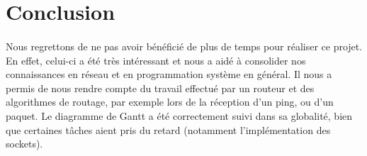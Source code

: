 \section{Conclusion}
\paragraph{}Nous regrettons de ne pas avoir bénéficié de plus de temps pour réaliser ce projet. En effet, celui-ci a été très intéressant et nous a aidé à consolider nos connaissances en réseau et en programmation système en général. Il nous a permis de nous rendre compte du travail effectué par un routeur et des algorithmes de routage, par exemple lors de la réception d’un ping, ou d’un paquet. Le diagramme de Gantt a été correctement suivi dans sa globalité, bien que certaines tâches aient pris du retard (notamment l'implémentation des sockets).